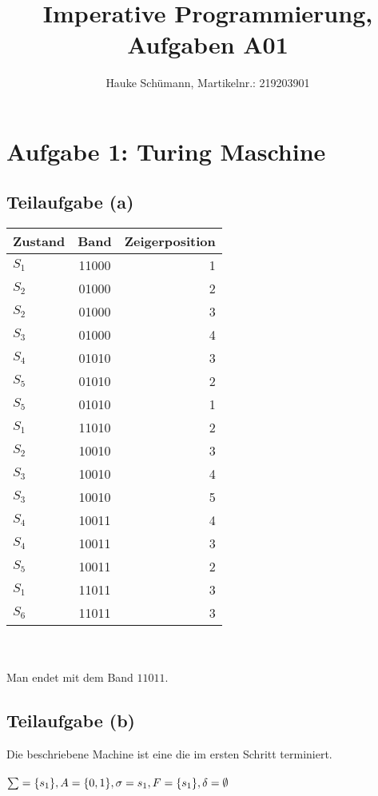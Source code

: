 \documentclass[11pt]{article} %
\title{Imperative Programmierung, Aufgaben A01}
\author{Hauke Schümann, Martikelnr.: 219203901}
\begin{document}
\maketitle

\section{Aufgabe 1: Turing Maschine}

\subsection{Teilaufgabe (a)}
\begin{large}
\begin{tabular}{|l|c|r|}
\hline
Zustand & Band & Zeigerposition\\\hline
$S_1$ & 11000 & 1\\\hline
$S_2$ & 01000 & 2\\\hline
$S_2$ & 01000 & 3\\\hline
$S_3$ & 01000 & 4\\\hline
$S_4$ & 01010 & 3\\\hline
$S_5$ & 01010 & 2\\\hline
$S_5$ & 01010 & 1\\\hline
$S_1$ & 11010 & 2\\\hline
$S_2$ & 10010 & 3\\\hline
$S_3$ & 10010 & 4\\\hline
$S_3$ & 10010 & 5\\\hline
$S_4$ & 10011 & 4\\\hline
$S_4$ & 10011 & 3\\\hline
$S_5$ & 10011 & 2\\\hline
$S_1$ & 11011 & 3\\\hline
$S_6$ & 11011 & 3\\\hline
\end{tabular}
\end{large}
\\\\
Man endet mit dem Band $11011$.

\subsection{Teilaufgabe (b)}

Die beschriebene Machine ist eine die im ersten Schritt terminiert.\\
\\
$\sum = \{s_1\}, \\
 A = \{0,1\}, \\
\sigma = s_1, \\
F = \{s_1\}, \\
\delta = \emptyset$
\end{document}
